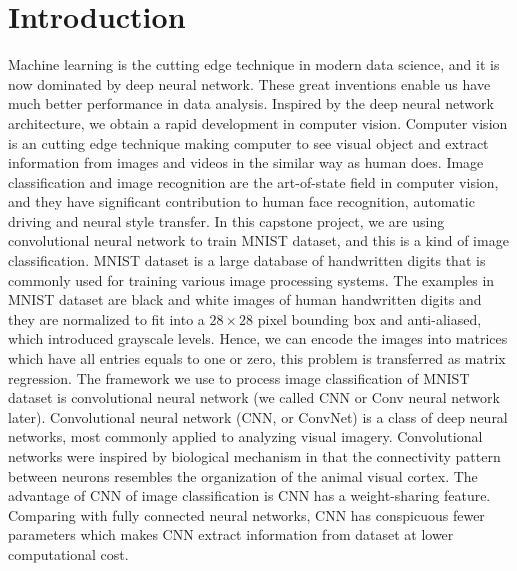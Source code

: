 \documentclass[12pt]{article}
\begin{document}
\tableofcontents
\newpage

\section{Introduction}
Machine learning is the cutting edge technique in modern data science, and it is now dominated by deep neural network. These great inventions enable us have much better performance in data analysis. Inspired by the deep neural network architecture, we obtain a rapid development in computer vision. Computer vision is an cutting edge technique making computer to see visual object and extract information from images and videos in the similar way as human does. Image classification and image recognition are the art-of-state field in computer vision, and they have significant contribution to human face recognition, automatic driving and neural style transfer. In this capstone project, we are using convolutional neural network to train MNIST dataset, and this is a kind of image classification. MNIST dataset is a large database of handwritten digits that is commonly used for training various image processing systems. The examples in MNIST dataset are black and white images of human handwritten digits and they are normalized to fit into a $28 \times 28$ pixel bounding box and anti-aliased, which introduced grayscale levels. Hence, we can encode the images into matrices which have all entries equals to one or zero, this problem is transferred as matrix regression. The framework we use to process image classification of MNIST dataset is convolutional neural network (we called CNN or Conv neural network later). Convolutional neural network (CNN, or ConvNet) is a class of deep neural networks, most commonly applied to analyzing visual imagery. Convolutional networks were inspired by biological mechanism in that the connectivity pattern between neurons resembles the organization of the animal visual cortex. The advantage of CNN of image classification is CNN has a weight-sharing feature. Comparing with fully connected neural networks, CNN has conspicuous fewer parameters which makes CNN extract information from dataset at lower computational cost. \\
~\\
\end{document}
